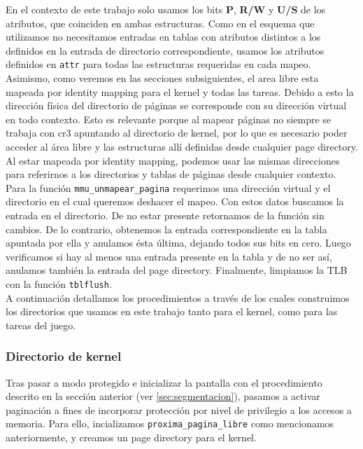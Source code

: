 En el contexto de este trabajo solo usamos los bits \textbf{P}, \textbf{R/W} y \textbf{U/S} de los atributos, que coinciden en ambas estructuras. 
Como en el esquema que utilizamos no necesitamos entradas en tablas con atributos distintos a los definidos en la entrada de directorio correspondiente, usamos los atributos definidos en \verb|attr| para todas las estructuras requeridas en cada mapeo.
Asimismo, como veremos en las secciones subsiguientes, el area libre esta mapeada por identity mapping para el kernel y todas las tareas. Debido a esto la dirección física del directorio de páginas se corresponde con su dirección virtual en todo contexto.
Esto es relevante porque al mapear páginas no siempre se trabaja con cr3 apuntando al directorio de kernel, por lo que es necesario poder acceder al área libre y las estructuras allí definidas desde cualquier page directory. Al estar mapeada por identity mapping, podemos usar las mismas direcciones para referirnos a los directorios y tablas de páginas desde cualquier contexto.\\

Para la función \verb|mmu_unmapear_pagina| requerimos una dirección virtual y el directorio en el cual queremos deshacer el mapeo. 
Con estos datos buscamos la entrada en el directorio. De no estar presente retornamos de la función sin cambios. De lo contrario, obtenemos la entrada correspondiente en la tabla apuntada por ella y anulamos ésta última, dejando todos sus bits en cero. 
Luego verificamos si hay al menos una entrada presente en la tabla y de no ser así, anulamos también la entrada del page directory.
Finalmente, limpiamos la TLB con la función \verb|tblflush|.\\

A continuación detallamos los procedimientos a través de los cuales construimos los directorios que usamos en este trabajo tanto para el kernel, como para las tareas del juego.\\

\vspace{10pt}

\subsubsection{Directorio de kernel}

Tras pasar a modo protegido e inicializar la pantalla con el procedimiento descrito en la sección anterior (ver \ref{sec:segmentacion}), pasamos a activar paginación a fines de incorporar protección por nivel de privilegio a los accesos a memoria.
Para ello, incializamos \verb|proxima_pagina_libre| como mencionamos anteriormente, y creamos un page directory para el kernel.

